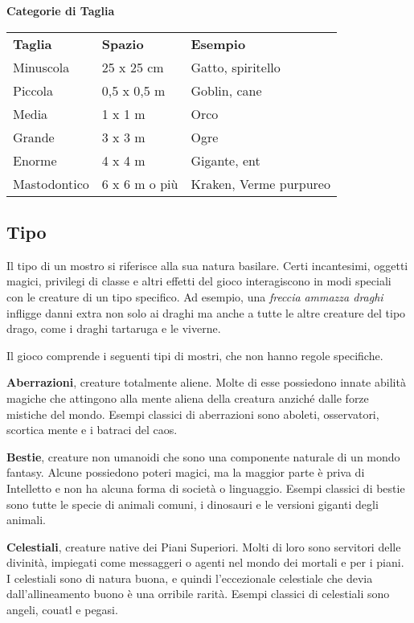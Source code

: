 \medskip

\textbf{Categorie di Taglia}

\begin{tabular}{lll}
\toprule
\textbf{Taglia}& \textbf{Spazio} & \textbf{Esempio}\\
Minuscola & 25 x 25 cm& Gatto, spiritello\\
Piccola & 0,5 x 0,5 m & Goblin, cane\\
Media & 1 x 1 m & Orco\\
Grande & 3 x 3 m& Ogre\\
Enorme & 4 x 4 m & Gigante, ent\\
Mastodontico & 6 x 6 m o più&Kraken, Verme purpureo\\
\end{tabular}

\subsection{Tipo}

Il tipo di un mostro si riferisce alla sua natura basilare. Certi incantesimi, oggetti magici, privilegi di classe e altri effetti del gioco interagiscono in modi speciali con le creature di un tipo specifico. Ad esempio, una \emph{freccia} \emph{ammazza draghi} infligge danni extra non solo ai draghi ma anche a tutte le altre creature del tipo drago, come i draghi tartaruga e le viverne.

Il gioco comprende i seguenti tipi di mostri, che non hanno regole specifiche.

\medskip\textbf{Aberrazioni}, creature totalmente aliene. Molte di esse possiedono innate abilità magiche che attingono alla mente aliena della creatura anziché dalle forze mistiche del mondo. Esempi classici di aberrazioni sono aboleti, osservatori, scortica mente e i batraci del caos.

\medskip\textbf{Bestie}, creature non umanoidi che sono una componente naturale di un mondo fantasy. Alcune possiedono poteri magici, ma la maggior parte è priva di Intelletto e non ha alcuna forma di società o linguaggio. Esempi classici di bestie sono tutte le specie di animali comuni, i dinosauri e le versioni giganti degli animali. 

\medskip\textbf{Celestiali}, creature native dei Piani Superiori. Molti di loro sono servitori delle divinità, impiegati come messaggeri o agenti nel mondo dei mortali e per i piani.\\
I celestiali sono di natura buona, e quindi l'eccezionale celestiale che devia dall'allineamento buono è una orribile rarità. Esempi classici di celestiali sono angeli, couatl e pegasi.

